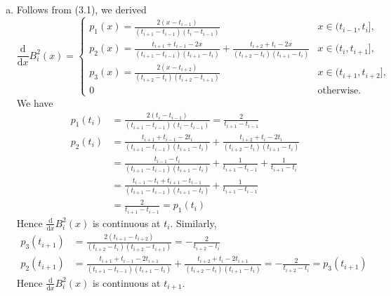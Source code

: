 \documentclass[11pt]{elegantbook}
\begin{document}
\begin{solution}
\begin{enumerate}[(a)]
    \item Follows from (3.1), we derived
    \begin{equation}
      \frac{\text{d}}{\text{d}x}B_i^2(x)=\left\{ \begin{array}{ll} 
        p_1(x)=\frac{2(x-t_{i-1})}{(t_{i+1}-t_{i-1})(t_i-t_{i-1})} & x\in(t_{i-1},t_i],\\
        p_2(x)=\frac{t_{i+1}+t_{i-1}-2x}{(t_{i+1}-t_{i-1})(t_{i+1}-t_i)}+\frac{t_{i+2}+t_i-2x}{(t_{i+2}-t_{i})(t_{i+1}-t_{i})} & x\in(t_i,t_{i+1}],\\
        p_3(x)=\frac{2(x-t_{i+2})}{(t_{i+2}-t_{i})(t_{i+2}-t_{i+1})} & x\in(t_{i+1},t_{i+2}],\\
        0 & \text{otherwise}.
      \end{array} \right.
    \end{equation}
    We have
    \begin{align*}
      p_1(t_i)&=\frac{2(t_i-t_{i-1})}{(t_{i+1}-t_{i-1})(t_i-t_{i-1})}=\frac{2}{t_{i+1}-t_{i-1}}\\
      p_2(t_i)&=\frac{t_{i+1}+t_{i-1}-2t_i}{(t_{i+1}-t_{i-1})(t_{i+1}-t_i)}+\frac{t_{i+2}+t_i-2t_i}{(t_{i+2}-t_{i})(t_{i+1}-t_{i})}\\
      &=\frac{t_{i-1}-t_i}{(t_{i+1}-t_{i-1})(t_{i+1}-t_i)}+\frac{1}{t_{i+1}-t_{i-1}}+\frac{1}{t_{i+1}-t_{i}}\\
      &=\frac{t_{i-1}-t_i+t_{i+1}-t_{i-1}}{(t_{i+1}-t_{i-1})(t_{i+1}-t_i)}+\frac{1}{t_{i+1}-t_{i-1}}\\
      &=\frac{2}{t_{i+1}-t_{i-1}} = p_1(t_i)
    \end{align*}
    Hence $\frac{\text{d}}{\text{d}x}B_i^2(x)$ is continuous at $t_i$. Similarly,
    \begin{align*}
      p_3(t_{i+1})&=\frac{2(t_{i+1}-t_{i+2})}{(t_{i+2}-t_{i})(t_{i+2}-t_{i+1})}=-\frac{2}{t_{i+2}-t_{i}}\\
      p_2(t_{i+1})&=\frac{t_{i+1}+t_{i-1}-2t_{i+1}}{(t_{i+1}-t_{i-1})(t_{i+1}-t_i)}+\frac{t_{i+2}+t_i-2t_{i+1}}{(t_{i+2}-t_{i})(t_{i+1}-t_{i})}=-\frac{2}{t_{i+2}-t_{i}}=p_3(t_{i+1})
    \end{align*}
    Hence $\frac{\text{d}}{\text{d}x}B_i^2(x)$ is continuous at $t_{i+1}$.
  

\end{enumerate}
\end{solution}
\end{document}

